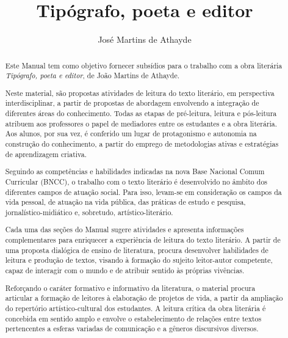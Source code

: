 \documentclass{extarticle}
\begin{document}
\newcommand{\AutorLivro}{José Martins de Athayde}
\newcommand{\TituloLivro}{Tipógrafo, poeta e editor}
\newcommand{\Tema}{Ficção, mistério e fantasia}
\newcommand{\Genero}{Poema}
\newcommand{\imagemCapa}{./images/PNLD0045-01.png}
\newcommand{\issnppub}{---}
\newcommand{\issnepub}{---}
\newcommand{\colaborador}{\textbf{Bruno Gradella e Vicente Castro} é uma pessoa incrível e vai fazer um bom serviço.}


\title{\TituloLivro}
\author{\AutorLivro}
\def\authornotes{\colaborador}

\date{}
\maketitle

\begin{abstract}
Este Manual tem como objetivo fornecer subsídios para o trabalho com a
obra literária \emph{Tipógrafo, poeta e editor}, de João Martins de
Athayde.

Neste material, são propostas atividades de leitura do texto literário,
em perspectiva interdisciplinar, a partir de propostas de abordagem
envolvendo a integração de diferentes áreas do conhecimento. Todas as
etapas de pré-leitura, leitura e pós-leitura atribuem aos professores o
papel de mediadores entre os estudantes e a obra literária. Aos alunos,
por sua vez, é conferido um lugar de protagonismo e autonomia na
construção do conhecimento, a partir do emprego de metodologias ativas e
estratégias de aprendizagem criativa.

Seguindo as competências e habilidades indicadas na nova Base Nacional
Comum Curricular (BNCC), o trabalho com o texto literário é desenvolvido
no âmbito dos diferentes campos de atuação social. Para isso, levam-se
em consideração os campos da vida pessoal, de atuação na vida pública,
das práticas de estudo e pesquisa, jornalístico-midiático e, sobretudo,
artístico-literário.

Cada uma das seções do Manual sugere atividades e apresenta informações
complementares para enriquecer a experiência de leitura do texto
literário. A partir de uma proposta dialógica de ensino de literatura,
procura desenvolver habilidades de leitura e produção de textos, visando
à formação do sujeito leitor-autor competente, capaz de interagir com o
mundo e de atribuir sentido às próprias vivências.

Reforçando o caráter formativo e informativo da literatura, o material
procura articular a formação de leitores à elaboração de projetos de
vida, a partir da ampliação do repertório artístico-cultural dos
estudantes. A leitura crítica da obra literária é concebida em sentido
amplo e envolve o estabelecimento de relações entre textos pertencentes
a esferas variadas de comunicação e a gêneros discursivos diversos.


\end{abstract}
\end{document}
